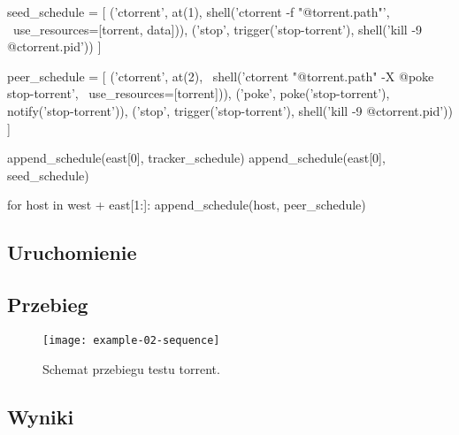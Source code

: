 \documentclass[00-praca-magisterska.tex]{subfiles}
\begin{document}
\begin{pythoncode}
  seed_schedule = [ 
      ('ctorrent', at(1), shell('ctorrent -f "@{torrent.path}"', \
          use_resources=[torrent, data])),
      ('stop', trigger('stop-torrent'), shell('kill -9 @{ctorrent.pid}'))
  ]
\end{pythoncode}

\begin{pythoncode}
  peer_schedule = [
      ('ctorrent', at(2), \
          shell('ctorrent "@{torrent.path}" -X @{poke stop-torrent}', \
          use_resources=[torrent])),
      ('poke', poke('stop-torrent'), notify('stop-torrent')),
      ('stop', trigger('stop-torrent'), shell('kill -9 @{ctorrent.pid}'))
  ]
\end{pythoncode}

\begin{pythoncode}
  append_schedule(east[0], tracker_schedule)
  append_schedule(east[0], seed_schedule)

  for host in west + east[1:]:
      append_schedule(host, peer_schedule)
\end{pythoncode}

\subsection{Uruchomienie}


\subsection{Przebieg}


\begin{figure}[htb]
\begin{center}
\leavevmode
\texttt{[image: example-02-sequence]}
\end{center}
\caption{Schemat przebiegu testu torrent.}
\label{fig:example-02-sequence}
\end{figure}

\subsection{Wyniki}

\end{document}
